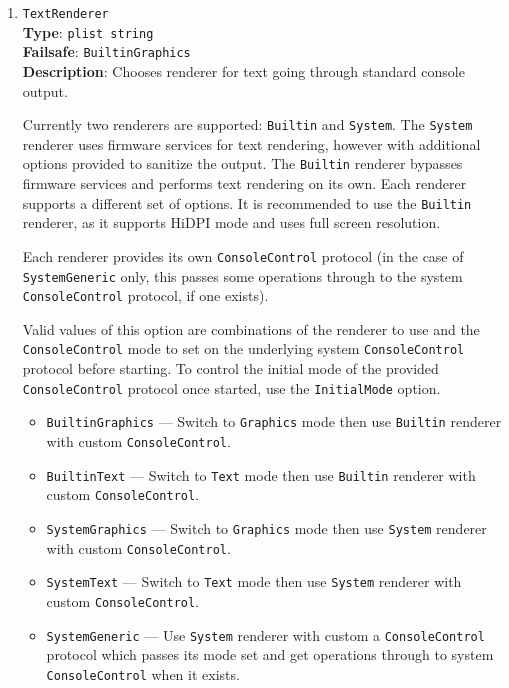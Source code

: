 \documentclass[]{article}
\providecommand{\tightlist}{%
  \setlength{\itemsep}{0pt}\setlength{\parskip}{0pt}}
\begin{document}
\begin{enumerate}
  \emph{Note}: This option only applies to the \texttt{System} renderer.
   On all known affected systems, \texttt{ConsoleMode} must be set to
   an empty string for this option to work.

\item
  \texttt{TextRenderer}\\
  \textbf{Type}: \texttt{plist\ string}\\
  \textbf{Failsafe}: \texttt{BuiltinGraphics}\\
  \textbf{Description}: Chooses renderer for text going through standard
  console output.

  Currently two renderers are supported: \texttt{Builtin} and
  \texttt{System}. The \texttt{System} renderer uses firmware services
  for text rendering, however with additional options provided to
  sanitize the output. The \texttt{Builtin} renderer bypasses firmware
  services and performs text rendering on its own. Each renderer
  supports a different set of options. It is recommended to use the
  \texttt{Builtin} renderer, as it supports HiDPI mode and uses
  full screen resolution.

  Each renderer provides its own \texttt{ConsoleControl} protocol
  (in the case of \texttt{SystemGeneric} only, this passes some
  operations through to the system \texttt{ConsoleControl} protocol,
  if one exists).

  Valid values of this option are combinations of the renderer to use
  and the \texttt{ConsoleControl} mode to set on the underlying system
  \texttt{ConsoleControl} protocol before starting. To control the initial
  mode of the provided \texttt{ConsoleControl} protocol once started, use
  the \texttt{InitialMode} option.

  \begin{itemize}
  \tightlist
  \item \texttt{BuiltinGraphics} --- Switch to \texttt{Graphics}
    mode then use \texttt{Builtin} renderer with
    custom \texttt{ConsoleControl}.
  \item \texttt{BuiltinText} --- Switch to \texttt{Text}
    mode then use \texttt{Builtin} renderer with
    custom \texttt{ConsoleControl}.
  \item \texttt{SystemGraphics} --- Switch to \texttt{Graphics}
    mode then use \texttt{System} renderer with
    custom \texttt{ConsoleControl}.
  \item \texttt{SystemText} --- Switch to \texttt{Text}
    mode then use \texttt{System} renderer with
    custom \texttt{ConsoleControl}.
  \item \texttt{SystemGeneric} --- Use \texttt{System} renderer with
    custom a \texttt{ConsoleControl} protocol which passes its mode set and
    get operations through to system \texttt{ConsoleControl} when it exists.
  \end{itemize}


\end{enumerate}
\end{document}
